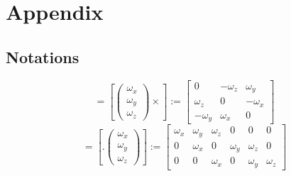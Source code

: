 

\chapter*{Appendix}
\label{appendix}
\vspace{1cm}

\section{Notations}
\begin{equation}
	[\vec{\omega} \times] = [\begin{pmatrix} \omega_x \\ \omega_y \\ \omega_z \end{pmatrix} \times] := 
	\begin{bmatrix}
		0			& -\omega_z	& \omega_y \\
		\omega_z	& 0			& -\omega_x \\
		-\omega_y	& \omega_x	& 0
	\end{bmatrix}
\end{equation}
\begin{equation}
	[. \vec{\omega}] = [. \begin{pmatrix} \omega_x \\ \omega_y \\ \omega_z \end{pmatrix}] :=
	\begin{bmatrix}
		\omega_x 	& \omega_y	& \omega_z	& 0			& 0			& 0 \\
		0			& \omega_x	& 0			& \omega_y	& \omega_z	& 0 \\
		0			& 0			& \omega_x	& 0			& \omega_y	& \omega_z
	\end{bmatrix}
\end{equation}